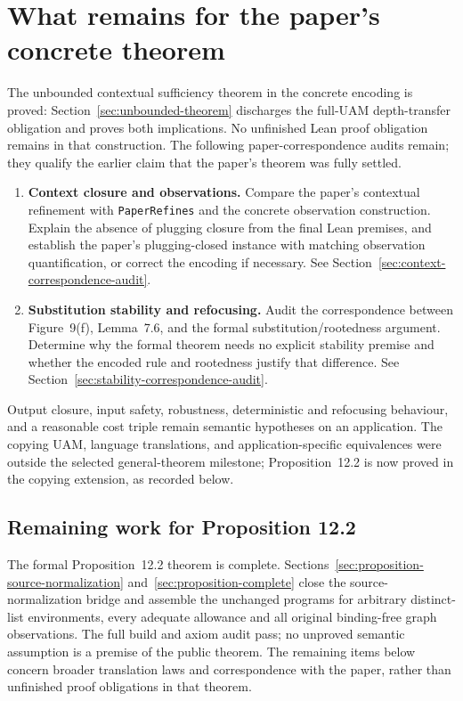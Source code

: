 \section{What remains for the paper's concrete theorem}
\label{app:remaining-work}
The unbounded contextual sufficiency theorem in the concrete encoding is
proved: Section~\ref{sec:unbounded-theorem} discharges the full-UAM depth-transfer
obligation and proves both implications. No unfinished Lean proof obligation
remains in that construction. The following paper-correspondence audits remain;
they qualify the earlier claim that the paper's theorem was fully settled.

\begin{enumerate}
\item \textbf{Context closure and observations.} Compare the paper's contextual
refinement with \texttt{PaperRefines} and the concrete observation construction.
Explain the absence of plugging closure from the final Lean premises, and
establish the paper's plugging-closed instance with matching observation
quantification, or correct the encoding if necessary.
See Section~\ref{sec:context-correspondence-audit}.
\item \textbf{Substitution stability and refocusing.} Audit the correspondence
between Figure~9(f), Lemma~7.6, and the formal substitution/rootedness argument.
Determine why the formal theorem needs no explicit stability premise and
whether the encoded rule and rootedness justify that difference.
See Section~\ref{sec:stability-correspondence-audit}.
\end{enumerate}

Output closure, input safety, robustness, deterministic and refocusing
behaviour, and a reasonable cost triple remain semantic hypotheses on an
application. The copying UAM, language translations, and application-specific
equivalences were outside the selected general-theorem milestone; Proposition~12.2
is now proved in the copying extension, as recorded below.

\clearpage
\subsection{Remaining work for Proposition 12.2}
The formal Proposition~12.2 theorem is complete. Sections~\ref{sec:proposition-source-normalization}
and~\ref{sec:proposition-complete} close the source-normalization bridge and
assemble the unchanged programs for arbitrary distinct-list environments,
every adequate allowance and all original binding-free graph observations.
The full build and axiom audit pass; no unproved semantic assumption is a
premise of the public theorem. The remaining items below concern broader
translation laws and correspondence with the paper, rather than unfinished
proof obligations in that theorem.

